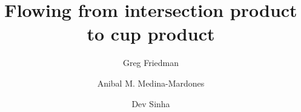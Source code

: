 \documentclass{amsart}
\title{Flowing from intersection product to cup product}
\author[G. Friedman]{Greg Friedman}
\author[A. Medina-Mardones]{Anibal M. Medina-Mardones}
\author[D. Sinha]{Dev Sinha}
\begin{document}

\maketitle
\tableofcontents
\sloppy
\printbibliography
\end{document}
